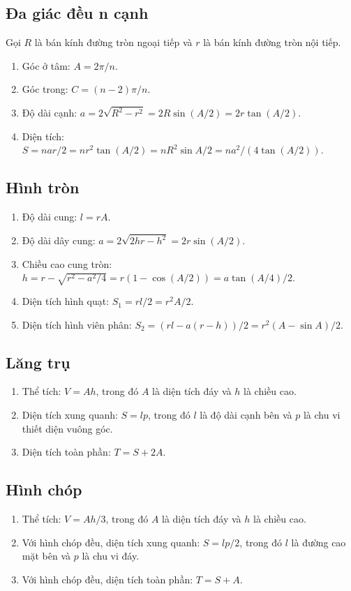 \documentclass[11pt]{article}
\begin{document}
\subsection{Đa giác đều n cạnh}
Gọi $R$ là bán kính đường tròn ngoại tiếp và $r$ là bán kính đường tròn nội tiếp.
\begin{enumerate}
\item Góc ở tâm: $A=2\pi/n$.
\item Góc trong: $C=(n-2)\pi/n$.
\item Độ dài cạnh: $a=2\sqrt{R^2-r^2}=2R\sin(A/2)=2r\tan(A/2)$.
\item Diện tích: $S=nar/2=nr^2\tan(A/2)=nR^2\sin A/2=na^2/(4\tan(A/2))$.
\end{enumerate}

\subsection{Hình tròn}
\begin{enumerate}
\item Độ dài cung: $l=rA$.
\item Độ dài dây cung: $a=2\sqrt{2hr-h^2}=2r\sin(A/2)$.
\item Chiều cao cung tròn: $h=r-\sqrt{r^2-a^2/4}=r(1-\cos(A/2))=a\tan(A/4)/2$.
\item Diện tích hình quạt: $S_1=rl/2=r^2A/2$.
\item Diện tích hình viên phân: $S_2=(rl-a(r-h))/2=r^2(A-\sin A)/2$.
\end{enumerate}

\subsection{Lăng trụ}
\begin{enumerate}
\item Thể tích: $V=Ah$, trong đó $A$ là diện tích đáy và $h$ là chiều cao.
\item Diện tích xung quanh: $S=lp$, trong đó $l$ là độ dài cạnh bên và $p$ là chu vi thiết diện vuông góc.
\item Diện tích toàn phần: $T=S+2A$.
\end{enumerate}

\subsection{Hình chóp}
\begin{enumerate}
\item Thể tích: $V=Ah/3$, trong đó $A$ là diện tích đáy và $h$ là chiều cao.
\item Với hình chóp đều, diện tích xung quanh: $S=lp/2$, trong đó $l$ là đường cao mặt bên và $p$ là chu vi đáy.
\item Với hình chóp đều, diện tích toàn phần: $T=S+A$.
\end{enumerate}
\end{document}

